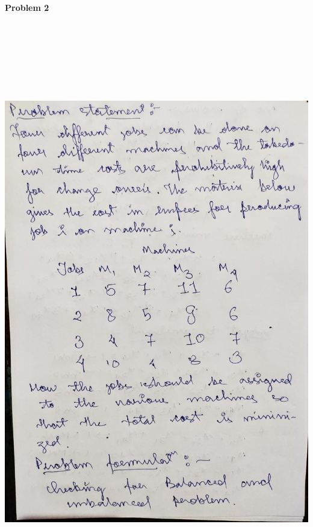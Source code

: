 \documentclass[12pt, letterpaper, twoside]{book}
\begin{document}
\begin{center}
\textbf{\\Problem 2}
\end{center}
\begin{flushleft}
\includegraphics[width=\paperwidth, height=10in]{Page7}
\end{flushleft}
\end{document}
